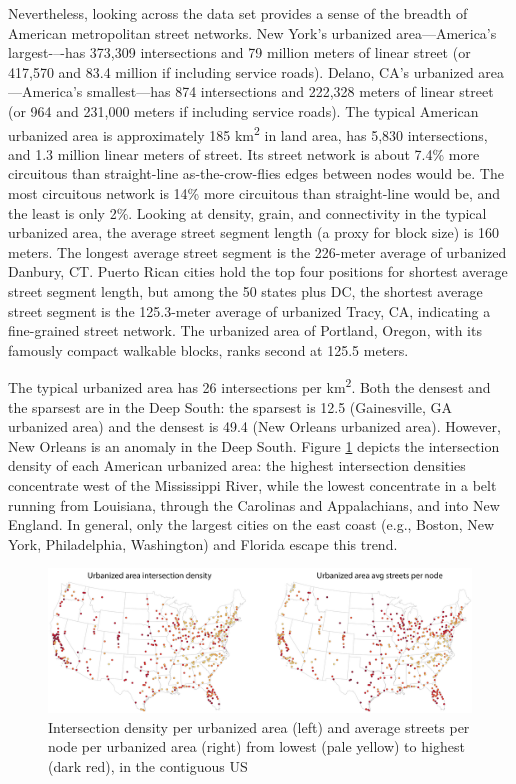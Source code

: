 \documentclass[Afour,sageh,times]{sagej}
\begin{document}
Nevertheless, looking across the data set provides a sense of the breadth of American metropolitan street networks. New York's urbanized area---America's largest-–-has 373,309 intersections and 79 million meters of linear street (or 417,570 and 83.4 million if including service roads). Delano, CA's urbanized area---America's smallest---has 874 intersections and 222,328 meters of linear street (or 964 and 231,000 meters if including service roads). The typical American urbanized area is approximately 185 km\textsuperscript{2} in land area, has 5,830 intersections, and 1.3 million linear meters of street. Its street network is about 7.4\% more circuitous than straight-line as-the-crow-flies edges between nodes would be. The most circuitous network is 14\% more circuitous than straight-line would be, and the least is only 2\%. Looking at density, grain, and connectivity in the typical urbanized area, the average street segment length (a proxy for block size) is 160 meters. The longest average street segment is the 226-meter average of urbanized Danbury, CT. Puerto Rican cities hold the top four positions for shortest average street segment length, but among the 50 states plus DC, the shortest average street segment is the 125.3-meter average of urbanized Tracy, CA, indicating a fine-grained street network. The urbanized area of Portland, Oregon, with its famously compact walkable blocks, ranks second at 125.5 meters.

The typical urbanized area has 26 intersections per km\textsuperscript{2}. Both the densest and the sparsest are in the Deep South: the sparsest is 12.5 (Gainesville, GA urbanized area) and the densest is 49.4 (New Orleans urbanized area). However, New Orleans is an anomaly in the Deep South. Figure \ref{fig:fig01} depicts the intersection density of each American urbanized area: the highest intersection densities concentrate west of the Mississippi River, while the lowest concentrate in a belt running from Louisiana, through the Carolinas and Appalachians, and into New England. In general, only the largest cities on the east coast (e.g., Boston, New York, Philadelphia, Washington) and Florida escape this trend.

\begin{figure}
	\includegraphics[width=1\textwidth]{fig01.png}
	\caption{Intersection density per urbanized area (left) and average streets per node per urbanized area (right) from lowest (pale yellow) to highest (dark red), in the contiguous US}
	\label{fig:fig01}
\end{figure}
\end{document}
